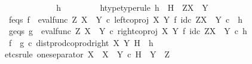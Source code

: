 \begin{isabellebody}
\isanewline
\ \ \ \ \isamarkupfalse%
\isanewline
\ \ \ \ \ \ \isamarkupfalse%
\ h\ \isanewline
\ \ \ \ \ \ \isamarkupfalse%
\ h{\isacharunderscore}{\kern0pt}type{\isacharbrackleft}{\kern0pt}type{\isacharunderscore}{\kern0pt}rule{\isacharbrackright}{\kern0pt}{\isacharcolon}{\kern0pt}\ {\isachardoublequoteopen}h\ {\isacharcolon}{\kern0pt}\ H\ {\isasymrightarrow}\ Z\isactrlbsup {\isacharparenleft}{\kern0pt}X\ {\isasymCoprod}\ Y{\isacharparenright}{\kern0pt}\isactrlesup {\isachardoublequoteclose}\isanewline
\ \ \ \ \ \ \isamarkupfalse%
\ f{\isacharunderscore}{\kern0pt}eqs{\isacharcolon}{\kern0pt}\ {\isachardoublequoteopen}f\ {\isacharequal}{\kern0pt}\ {\isacharparenleft}{\kern0pt}eval{\isacharunderscore}{\kern0pt}func\ Z\ {\isacharparenleft}{\kern0pt}X\ {\isasymCoprod}\ Y{\isacharparenright}{\kern0pt}\ {\isasymcirc}\isactrlsub c\ left{\isacharunderscore}{\kern0pt}coproj\ X\ Y\ {\isasymtimes}\isactrlsub f\ id\isactrlsub c\ {\isacharparenleft}{\kern0pt}Z\isactrlbsup {\isacharparenleft}{\kern0pt}X\ {\isasymCoprod}\ Y{\isacharparenright}{\kern0pt}\isactrlesup {\isacharparenright}{\kern0pt}{\isacharparenright}{\kern0pt}\isactrlsup {\isasymsharp}\ {\isasymcirc}\isactrlsub c\ \ h{\isachardoublequoteclose}\isanewline
\ \ \ \ \ \ \isamarkupfalse%
\ g{\isacharunderscore}{\kern0pt}eqs{\isacharcolon}{\kern0pt}\ {\isachardoublequoteopen}g\ {\isacharequal}{\kern0pt}\ {\isacharparenleft}{\kern0pt}eval{\isacharunderscore}{\kern0pt}func\ Z\ {\isacharparenleft}{\kern0pt}X\ {\isasymCoprod}\ Y{\isacharparenright}{\kern0pt}\ {\isasymcirc}\isactrlsub c\ right{\isacharunderscore}{\kern0pt}coproj\ X\ Y\ {\isasymtimes}\isactrlsub f\ id\isactrlsub c\ {\isacharparenleft}{\kern0pt}Z\isactrlbsup {\isacharparenleft}{\kern0pt}X\ {\isasymCoprod}\ Y{\isacharparenright}{\kern0pt}\isactrlesup {\isacharparenright}{\kern0pt}{\isacharparenright}{\kern0pt}\isactrlsup {\isasymsharp}\ {\isasymcirc}\isactrlsub c\ h{\isachardoublequoteclose}\isanewline
\ \ \ \ \ \ \isamarkupfalse%
\ {\isachardoublequoteopen}{\isacharparenleft}{\kern0pt}f\isactrlsup {\isasymflat}\ {\isasymamalg}\ g\isactrlsup {\isasymflat}\ {\isasymcirc}\isactrlsub c\ dist{\isacharunderscore}{\kern0pt}prod{\isacharunderscore}{\kern0pt}coprod{\isacharunderscore}{\kern0pt}right\ X\ Y\ H{\isacharparenright}{\kern0pt}\ {\isacharequal}{\kern0pt}\ h\isactrlsup {\isasymflat}{\isachardoublequoteclose}\isanewline
\ \ \ \ \ \ \isamarkupfalse%
{\isacharparenleft}{\kern0pt}etcs{\isacharunderscore}{\kern0pt}rule\ one{\isacharunderscore}{\kern0pt}separator{\isacharbrackleft}{\kern0pt}\ X\ {\isacharequal}{\kern0pt}\ {\isachardoublequoteopen}{\isacharparenleft}{\kern0pt}X\ {\isasymCoprod}\ Y{\isacharparenright}{\kern0pt}\ {\isasymtimes}\isactrlsub c\ H{\isachardoublequoteclose}{\isacharcomma}{\kern0pt}\ \ Y\ {\isacharequal}{\kern0pt}\ Z{\isacharbrackright}{\kern0pt}{\isacharparenright}{\kern0pt}\isanewline

\end{isabellebody}
